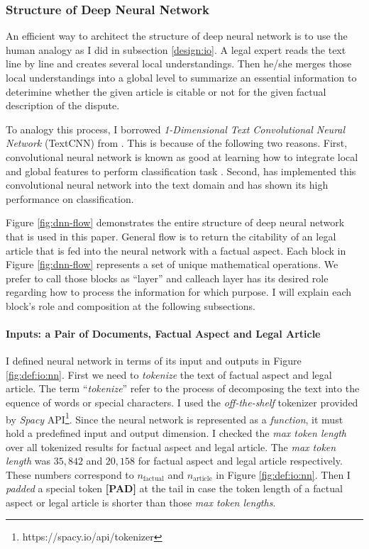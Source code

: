 \documentclass[12pt,letterpaper]{article}
\begin{document}
\subsubsection{Structure of Deep Neural Network}


An efficient way to architect the structure of deep neural network is to use the
human analogy as I did in subsection \ref{design:io}.
A legal expert reads the text line by line and creates several local understandings.
Then he/she merges those local understandings into a global level to summarize
an essential information to deterimine whether
the given article is citable or not for the given factual description of the dispute.

To analogy this process, I borrowed \textit{1-Dimensional Text Convolutional Neural Network} (TextCNN) from \cite{textcnn}.
This is because of the following two reasons.
First, convolutional neural network is known as good at learning how to integrate local and global features to perform classification task \citep{554195, 8227460}.
Second, \cite{textcnn} has implemented this convolutional neural network into the text domain
and has shown its high performance on classification.

Figure \ref{fig:dnn-flow} demonstrates the entire structure of deep neural network that is used in this paper.
General flow is to return the citability of an legal article that is fed into the neural network with a factual aspect. 
Each block in Figure \ref{fig:dnn-flow} represents a set of unique mathematical operations. 
We prefer to call those blocks as ``layer'' 
and calleach layer has its desired role regarding how to process the information for which purpose.
I will explain each block's role and composition at the following subsections.

\paragraph{Inputs: a Pair of Documents, Factual Aspect and Legal Article}

I defined neural network in terms of its input and outputs in Figure \ref{fig:def:io:nn}.
First we need to \textit{tokenize} the text of factual aspect and legal article. The term ``\textit{tokenize}''
refer to the process of decomposing the text into the equence of words or special characters. 
I used the \textit{off-the-shelf} tokenizer provided by \textit{Spacy} API\footnote{https://spacy.io/api/tokenizer}.
Since the neural network is represented as a \textit{function}, it must hold a predefined input and output dimension.
I checked the \textit{max token length} over all tokenized results for factual aspect and legal article.
The \textit{max token length} was $35,842$ and $20,158$ for factual aspect and legal article respectively. These numbers correspond to $n_{\text{factual}}$ and $n_{\text{article}}$ in Figure \ref{fig:def:io:nn}.
Then I \textit{padded} a special token \textbf{[PAD]} at the tail in case the token length of a factual aspect 
or legal article is shorter than those \textit{max token lengths}. 
\end{document}
